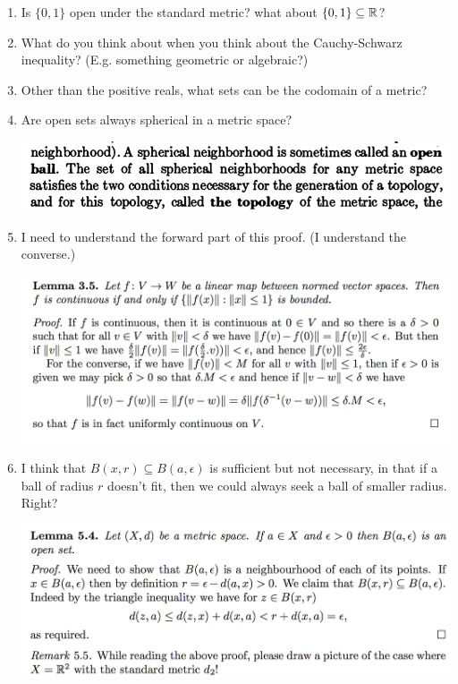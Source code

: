 \documentclass[12pt]{article}
\begin{document}
\begin{enumerate}
\item Is $\{0, 1\}$ open under the standard metric? what about $\{0, 1\} \subseteq \mathbb{R}$?
\item What do you think about when you think about the Cauchy-Schwarz inequality? (E.g. something
  geometric or algebraic?)
\item Other than the positive reals, what sets can be the codomain of a metric?
\item Are open sets always spherical in a metric space?
  \begin{mdframed}
    \includegraphics[width=400pt]{img/questions-metric-space-open-sets-gelbaum.png}
  \end{mdframed}
\newpage
\item I need to understand the forward part of this proof. (I understand the converse.)
  \begin{mdframed}
    \includegraphics[width=400pt]{img/questions-oxford-a2-linear-transformation-continuity.png}
  \end{mdframed}
\item I think that $B(x, r) \subseteq B(a, \epsilon)$ is sufficient but not necessary, in that if a
  ball of radius $r$ doesn't fit, then we could always seek a ball of smaller radius. Right?
  \begin{mdframed}
    \includegraphics[width=400pt]{img/questions-oxford-a2-ball-is-open-proof.png}\\

\end{mdframed}
\end{enumerate}
\end{document}
